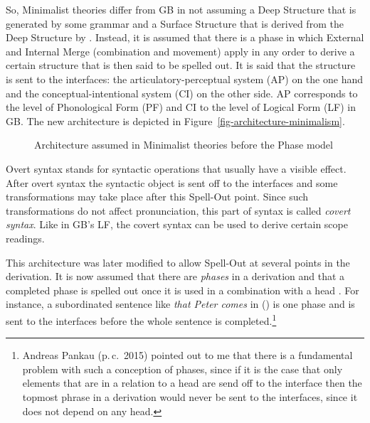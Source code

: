 \addlines
So, Minimalist theories differ from GB in not assuming a Deep Structure that is generated by some
\xbar grammar and a Surface Structure that is derived from the Deep Structure by \movea. Instead, it
is assumed that there is a phase in which External and Internal Merge (combination and movement)
apply in any order to derive a certain structure that is then said to be spelled out. It is said
that the structure is sent to the interfaces: the articulatory-perceptual system (AP) on the one hand and
the conceptual-intentional system (CI) on the other side. AP corresponds to the level of
Phonological Form (PF) and CI to the level of Logical Form (LF) in GB. The new architecture is
depicted in Figure~\vref{fig-architecture-minimalism}.
\begin{figure}
\caption{\label{fig-architecture-minimalism}Architecture assumed in Minimalist theories before the
  Phase model}
\end{figure}%
Overt syntax stands for syntactic operations that usually have a visible effect. After overt syntax
the syntactic object is sent off to the interfaces and some transformations may take place after
this Spell-Out point. Since such transformations do not affect pronunciation, this part of syntax is
called \emph{covert syntax}. Like in GB's LF, the covert syntax can be used to derive certain scope
readings. 

This architecture was later modified to allow Spell-Out at several points in the derivation. It is now
assumed that there are \emph{phases} in a derivation and that a completed phase is spelled out once it is
used in a combination with a head \citep{Chomsky2008a}. For instance, a subordinated sentence like \emph{that Peter comes} in () is one
phase and is sent to the interfaces before the whole sentence is completed.\footnote{%
  Andreas Pankau (p.\,c.\, 2015) pointed out to me that there is a fundamental problem with such a
  conception of phases, since if it is the case that only elements that are in a relation to a head
  are send off to the interface then the topmost phrase in a derivation would never be sent to the interfaces, since it does not depend on any head.
}

